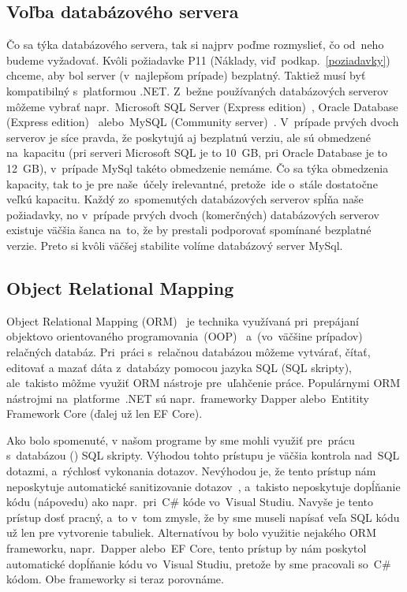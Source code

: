 \subsection{Voľba databázového servera}

Čo sa týka databázového servera, tak si najprv poďme rozmyslieť, čo od~neho budeme vyžadovať. Kvôli požiadavke P11 (Náklady, viď~podkap.~\ref{poziadavky}) chceme, aby bol server (v~najlepšom prípade) bezplatný. Taktiež musí byť kompatibilný s~platformou .NET. Z~bežne používaných databázových serverov môžeme vybrať napr.~Microsoft SQL Server (Express edition)~\cite{microsoft sql server}, Oracle Database (Express edition)~\cite{oracle database} alebo~MySQL (Community server)~\cite{mysql}. V~prípade prvých dvoch serverov je síce pravda, že poskytujú aj bezplatnú verziu, ale sú obmedzené na~kapacitu (pri serveri Microsoft SQL je to 10~GB, pri Oracle Database je to 12~GB), v~prípade MySql takéto obmedzenie nemáme. Čo sa týka obmedzenia kapacity, tak to je pre naše~účely irelevantné, pretože~ide o~stále dostatočne veľkú kapacitu. Každý zo~spomenutých databázových serverov spĺňa naše požiadavky, no v~prípade prvých dvoch (komerčných) databázových serverov existuje väčšia šanca na~to, že by prestali podporovať spomínané bezplatné verzie. Preto si kvôli väčšej stabilite volíme databázový server MySql.

\subsection{Object Relational Mapping}

Object Relational Mapping (ORM)~\cite{orm} je technika využívaná pri~prepájaní objektovo orientovaného programovania~(OOP)~\cite{oop} a~(vo~väčšine prípadov) relačných databáz. Pri~práci s~relačnou databázou môžeme vytvárať, čítať, editovať a mazať dáta z~databázy pomocou jazyka SQL (SQL skripty), ale~takisto môžme využiť ORM nástroje pre~uľahčenie práce. Populárnymi ORM nástrojmi na~platforme~.NET sú napr.~frameworky Dapper alebo~Entitity Framework Core (ďalej už len EF Core).

Ako bolo spomenuté, v našom programe by sme mohli využiť pre~prácu s~databázou () SQL skripty. Výhodou tohto prístupu je väčšia kontrola nad~SQL dotazmi, a~rýchlosť vykonania dotazov. Nevýhodou je, že tento prístup nám neposkytuje automatické sanitizovanie dotazov~\cite{sanitization}, a~takisto neposkytuje dopĺňanie kódu (nápovedu) ako napr.~pri~C\# kóde vo~Visual Studiu. Navyše je tento prístup dosť pracný, a~to v~tom zmysle, že by sme museli napísať veľa SQL kódu už len pre vytvorenie tabuliek. Alternatívou by bolo využitie nejakého ORM frameworku, napr.~Dapper alebo~EF Core, tento prístup by nám poskytol automatické dopĺňanie kódu vo~Visual Studiu, pretože by sme pracovali so~C\# kódom. Obe frameworky si teraz porovnáme. 


